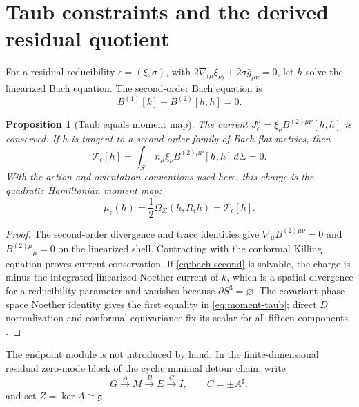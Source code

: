 \documentclass[11pt]{article}
\newtheorem{proposition}[theorem]{Proposition}
\theoremstyle{remark}
\newcommand{\g}{\mathfrak g}
\begin{document}
\section{Taub constraints and the derived residual quotient}

For a residual reducibility $\epsilon=(\xi,\sigma)$, with
$2\nabla_{(\mu}\xi_{\nu)}+2\sigma\bar g_{\mu\nu}=0$, let $h$ solve the
linearized Bach equation.  The second-order Bach equation is
\begin{equation}\label{eq:bach-second}
 B^{(1)}[k]+B^{(2)}[h,h]=0.
\end{equation}

\begin{proposition}[Taub equals moment map]\label{prop:taub}
The current $J_\epsilon^\mu=\xi_\nu B^{(2)\mu\nu}[h,h]$ is conserved.  If
$h$ is tangent to a second-order family of Bach-flat metrics, then
\begin{equation}\label{eq:taub}
 \mathcal T_\epsilon[h]
 =\int_{S^3}n_\mu\xi_\nu B^{(2)\mu\nu}[h,h]\,d\Sigma=0.
\end{equation}
With the action and orientation conventions used here, this charge is the
quadratic Hamiltonian moment map:
\begin{equation}\label{eq:moment-taub}
 \mu_\epsilon(h)=\frac12\Omega_\Sigma(h,R_\epsilon h)
 =\mathcal T_\epsilon[h].
\end{equation}
\end{proposition}

\begin{proof}
The second-order divergence and trace identities give
$\nabla_\mu B^{(2)\mu\nu}=0$ and $B^{(2)\mu}{}_{\mu}=0$ on the linearized
shell.  Contracting with the conformal Killing equation proves current
conservation.  If \eqref{eq:bach-second} is solvable, the charge is minus the
integrated linearized Noether current of $k$, which is a spatial divergence
for a reducibility parameter and vanishes because $\partial S^3=\varnothing$.
The covariant phase-space Noether identity gives the first equality in
\eqref{eq:moment-taub}; direct $D$ normalization and conformal equivariance
fix its scalar for all fifteen components
\cite{AltasTekinLinearization,BarnichBrandtHenneaux}.
\end{proof}

The endpoint module is not introduced by hand.  In the finite-dimensional
residual zero-mode block of the cyclic minimal detour chain, write
\begin{equation}\label{eq:detour}
 G\xrightarrow{A}M\xrightarrow{B}E\xrightarrow{C}I,
 \qquad C=\pm A^\sharp,
\end{equation}
and set $Z=\ker A\cong\g$.
\end{document}

